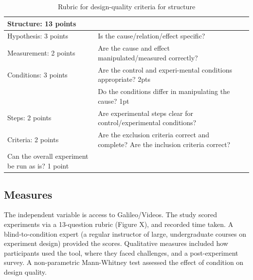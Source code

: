 \vspace{0.25in}
\begin{table}[!ht]
\caption[]{Rubric for design-quality criteria for structure}

\vspace{-0.25in}
\begin{center}
\begin{tabular}{|p{1in}|p{2in}|p{3in}|}

\hline
Structure: 13 points &  \\

\hline
Hypothesis: 3 points & Is the cause/relation/effect specific?  \\

\hline
Measurement: 2 points & Are the cause and effect manipulated/measured correctly? \\

\hline
Conditions: 3 points  & Are the control and experi-mental conditions appropriate? 2pts \\
 & Do the conditions differ in manipulating the cause? 1pt \\

\hline
Steps: 2 points  & Are experimental steps clear for control/experimental conditions?  \\

\hline
Criteria: 2 points & Are the exclusion criteria correct and complete? Are the inclusion criteria correct? \\

\hline
Can the overall experiment be run as is? 1 point \\

\hline
\end{tabular}
\end{center}
\label{tab:rubric1}
\end{table}


\subsection{Measures}
The independent variable is access to Galileo/Videos. The study scored experiments via a 13-question rubric (Figure X), and recorded time taken. A blind-to-condition expert (a regular instructor of large, undergraduate courses on experiment design) provided the scores. Qualitative measures included how participants used the tool, where they faced challenges, and a post-experiment survey. A non-parametric Mann-Whitney test assessed the effect of condition on design quality. 

